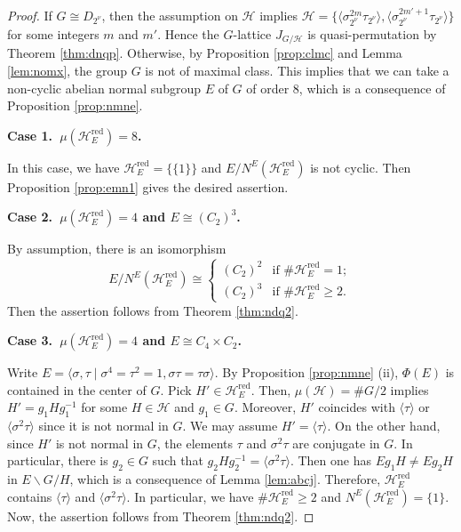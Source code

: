 \documentclass[12pt]{amsart}
\theoremstyle{plain}
\theoremstyle{definition}
\numberwithin{thm}{section}
\numberwithin{equation}{section}
\newcommand{\cH}{\mathcal{H}}
\DeclareMathOperator{\red}{red}
\begin{document}
\begin{proof}
If $G\cong D_{2^{\nu}}$, then the assumption on $\cH$ implies $\cH=\{\langle \sigma_{2^{\nu}}^{2m}\tau_{2^{\nu}}\rangle,\langle \sigma_{2^{\nu}}^{2m'+1}\tau_{2^{\nu}}\rangle\}$ for some integers $m$ and $m'$. Hence the $G$-lattice $J_{G/\cH}$ is quasi-permutation by Theorem \ref{thm:dnqp}. Otherwise, by Proposition \ref{prop:clmc} and Lemma \ref{lem:nomx}, the group $G$ is not of maximal class. This implies that we can take a non-cyclic abelian normal subgroup $E$ of $G$ of order $8$, which is a consequence of Proposition \ref{prop:nmne}. 

\textbf{Case 1.~$\mu(\cH_{E}^{\red})=8$. }

In this case, we have $\cH_{E}^{\red}=\{\{1\}\}$ and $E/N^{E}(\cH_{E}^{\red})$ is not cyclic. Then Proposition \ref{prop:emn1} gives the desired assertion. 

\textbf{Case 2.~$\mu(\cH_{E}^{\red})=4$ and $E\cong (C_{2})^{3}$. }

By assumption, there is an isomorphism 
\begin{equation*}
E/N^{E}(\cH_{E}^{\red})\cong
\begin{cases}
    (C_{2})^{2}&\text{if }\#\cH_{E}^{\red}=1;\\
    (C_{2})^{3}&\text{if }\#\cH_{E}^{\red}\geq 2. 
\end{cases}
\end{equation*}
Then the assertion follows from Theorem \ref{thm:ndq2}. 

\textbf{Case 3.~$\mu(\cH_{E}^{\red})=4$ and $E\cong C_{4}\times C_{2}$. }

Write $E=\langle \sigma,\tau \mid \sigma^{4}=\tau^{2}=1,\sigma\tau=\tau\sigma\rangle$. By Proposition \ref{prop:nmne} (ii), $\Phi(E)$ is contained in the center of $G$. Pick $H'\in \cH_{E}^{\red}$. Then, $\mu(\cH)=\#G/2$ implies $H'=g_{1}Hg_{1}^{-1}$ for some $H\in \cH$ and $g_{1}\in G$. Moreover, $H'$ coincides with $\langle \tau \rangle$ or $\langle \sigma^{2}\tau \rangle$ since it is not normal in $G$. We may assume $H'=\langle \tau \rangle$. On the other hand, since $H'$ is not normal in $G$, the elements $\tau$ and $\sigma^{2}\tau$ are conjugate in $G$. In particular, there is $g_{2}\in G$ such that $g_{2}Hg_{2}^{-1}=\langle \sigma^{2}\tau\rangle$. Then one has $Eg_{1}H \neq Eg_{2}H$ in $E\backslash G/H$, which is a consequence of Lemma \ref{lem:abcj}. Therefore, $\cH_{E}^{\red}$ contains $\langle \tau \rangle$ and $\langle \sigma^{2}\tau \rangle$. In particular, we have $\#\cH_{E}^{\red}\geq 2$ and $N^{E}(\cH_{E}^{\red})=\{1\}$. Now, the assertion follows from Theorem \ref{thm:ndq2}. 
\end{proof}
\end{document}
